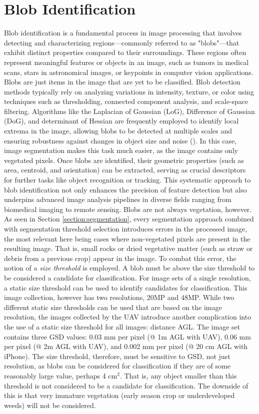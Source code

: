 \documentclass[letterpaper, notitlepage]{report}
\begin{document}
{\section{Blob Identification}
Blob identification is a fundamental process in image processing that involves detecting and characterizing regions—commonly referred to as "blobs"—that exhibit distinct properties compared to their surroundings. These regions often represent meaningful features or objects in an image, such as tumors in medical scans, stars in astronomical images, or keypoints in computer vision applications. Blobs are just items in the image that are yet to be classified.  Blob detection methods typically rely on analyzing variations in intensity, texture, or color using techniques such as thresholding, connected component analysis, and scale-space filtering. Algorithms like the Laplacian of Gaussian (LoG), Difference of Gaussian (DoG), and determinant of Hessian are frequently employed to identify local extrema in the image, allowing blobs to be detected at multiple scales and ensuring robustness against changes in object size and noise (\cite{Lindeberg1998-es}). In this case, image segmentation makes this task much easier, as the image contains only vegetated pixels. Once blobs are identified, their geometric properties (such as area, centroid, and orientation) can be extracted, serving as crucial descriptors for further tasks like object recognition or tracking. This systematic approach to blob identification not only enhances the precision of feature detection but also underpins advanced image analysis pipelines in diverse fields ranging from biomedical imaging to remote sensing. Blobs are not always vegetation, however. As seen in Section \ref{section:segmentation}, every segmentation approach combined with segmentation threshold selection introduces errors in the processed image, the most relevant here being cases where non-vegetated pixels are present in the resulting image. That is, small rocks or dried vegetative matter (such as straw or debris from a previous crop) appear in the image. To combat this error, the notion of a \textit{size threshold} is employed.  A blob must be above the size threshold to be considered a candidate for classification. For image sets of a single resolution, a static size threshold can be used to identify candidates for classification. This image collection, however has two resolutions, 20MP and 48MP. While two different static size thresholds can be used that are based on the image resolution, the images collected by the \gls{UAV} introduce another complication into the use of a static size threshold for all images: distance \gls{AGL}. The image set contains three \gls{GSD} values: 0.03 mm per pixel (@ 1m AGL with \gls{UAV}), 0.06 mm per pixel (@ 2m AGL with \gls{UAV}), and 0.002 mm per pixel (@ 20 cm AGL with iPhone). The size threshold, therefore, must be sensitive to \gls{GSD}, not just resolution, as blobs can be considered for classification if they are of some reasonably large value, perhaps 4 cm$^2$. That is, any object smaller than this threshold is not considered to be a candidate for classification. The downside of this is that very immature vegetation (early season crop or underdeveloped weeds) will not be considered.

}
\end{document}
